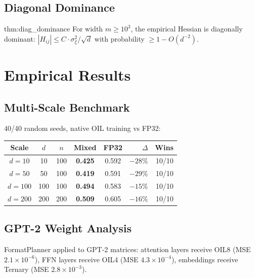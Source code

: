 \documentclass[11pt,a4paper]{article}
\theoremstyle{definition}
\begin{document}
\subsection{Diagonal Dominance}

\begin{mythm}{thm:diag_dominance}
For width $m \geq 10^3$, the empirical Hessian is diagonally dominant: $|H_{ij}| \leq C \cdot \sigma_\xi^2 / \sqrt{d}$ with probability $\geq 1 - O(d^{-2})$.
\end{mythm}


\section{Empirical Results}
\label{sec:results}

\subsection{Multi-Scale Benchmark}

40/40 random seeds, native OIL training vs FP32:

\begin{center}
\begin{tabular}{cccccrr}
\toprule
\textbf{Scale} & $d$ & $n$ & \textbf{Mixed} & \textbf{FP32} & $\Delta$ & \textbf{Wins} \\
\midrule
$d=10$ & 10 & 100 & \textbf{0.425} & 0.592 & $-28\%$ & 10/10 \\
$d=50$ & 50 & 100 & \textbf{0.419} & 0.591 & $-29\%$ & 10/10 \\
$d=100$ & 100 & 100 & \textbf{0.494} & 0.583 & $-15\%$ & 10/10 \\
$d=200$ & 200 & 200 & \textbf{0.509} & 0.605 & $-16\%$ & 10/10 \\
\bottomrule
\end{tabular}
\end{center}

\subsection{GPT-2 Weight Analysis}

FormatPlanner applied to GPT-2 matrices: attention layers receive OIL8 (MSE $2.1 \times 10^{-6}$), FFN layers receive OIL4 (MSE $4.3 \times 10^{-4}$), embeddings receive Ternary (MSE $2.8 \times 10^{-3}$).
\end{document}
